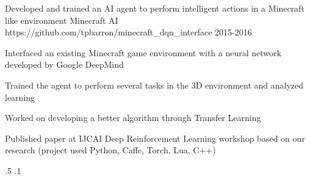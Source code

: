 \begin{cventries}

\vspace{-2.25em}
\myProject
{Developed and trained an AI agent to perform intelligent actions in a Minecraft like environment} %
{Minecraft AI} %
{https://github.com/tpbarron/minecraft\_dqn\_interface} %
{2015-2016} %
{ %
\begin{cvitems}
\item {Interfaced an existing Minecraft game environment with a neural network developed by Google DeepMind}
\item {Trained the agent to perform several tasks in the 3D environment and analyzed learning}
\item {Worked on developing a better algorithm through Transfer Learning}
\item {Published paper at IJCAI Deep Reinforcement Learning workshop based on our research (project used Python, Caffe, Torch, Lua, C++)}
\end{cvitems}
}
{.5}
{.1}





\end{cventries}